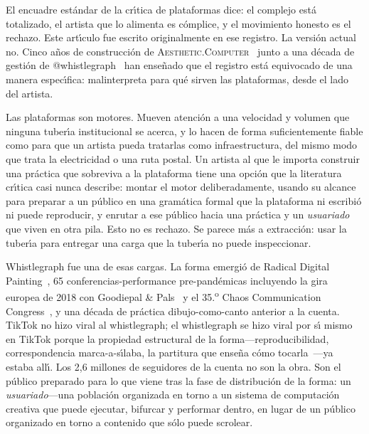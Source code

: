 \documentclass[10pt,letterpaper,twocolumn]{article}
\newcommand{\ac}{\textsc{Aesthetic.Computer}}
\begin{document}
El encuadre est\'{a}ndar de la cr\'{\i}tica de plataformas dice: el complejo est\'{a} totalizado, el artista que lo alimenta es c\'{o}mplice, y el movimiento honesto es el rechazo. Este art\'{\i}culo fue escrito originalmente en ese registro. La versi\'{o}n actual no. Cinco a\~{n}os de construcci\'{o}n de \ac{}~\citep{scudder2026ac} junto a una d\'{e}cada de gesti\'{o}n de @whistlegraph~\citep{scudder2026whistlegraph} han ense\~{n}ado que el registro est\'{a} equivocado de una manera espec\'{\i}fica: malinterpreta para qu\'{e} sirven las plataformas, desde el lado del artista.

Las plataformas son motores. Mueven atenci\'{o}n a una velocidad y volumen que ninguna tuber\'{\i}a institucional se acerca, y lo hacen de forma suficientemente fiable como para que un artista pueda tratarlas como infraestructura, del mismo modo que trata la electricidad o una ruta postal. Un artista al que le importa construir una pr\'{a}ctica que sobreviva a la plataforma tiene una opci\'{o}n que la literatura cr\'{\i}tica casi nunca describe: montar el motor deliberadamente, usando su alcance para preparar a un p\'{u}blico en una gram\'{a}tica formal que la plataforma ni escribi\'{o} ni puede reproducir, y enrutar a ese p\'{u}blico hacia una pr\'{a}ctica y un \emph{usuariado} que viven en otra pila. Esto no es rechazo. Se parece m\'{a}s a extracci\'{o}n: usar la tuber\'{\i}a para entregar una carga que la tuber\'{\i}a no puede inspeccionar.

Whistlegraph fue una de esas cargas. La forma emergi\'{o} de Radical Digital Painting~\citep{scudder2017manifesto}, 65 conferencias-performance pre-pand\'{e}micas incluyendo la gira europea de 2018 con Goodiepal \& Pals~\citep{scudder2026goodiepal} y el 35.\textsuperscript{o} Chaos Communication Congress~\citep{scudder2018rdp35c3}, y una d\'{e}cada de pr\'{a}ctica dibujo-como-canto anterior a la cuenta. TikTok no hizo viral al whistlegraph; el whistlegraph se hizo viral por s\'{\i} mismo en TikTok porque la propiedad estructural de la forma---reproducibilidad, correspondencia marca-a-s\'{\i}laba, la partitura que ense\~{n}a c\'{o}mo tocarla~\citep{scudder2026whistlegraph}---ya estaba all\'{\i}. Los 2,6 millones de seguidores de la cuenta no son la obra. Son el p\'{u}blico preparado para lo que viene tras la fase de distribuci\'{o}n de la forma: un \emph{usuariado}---una poblaci\'{o}n organizada en torno a un sistema de computaci\'{o}n creativa que puede ejecutar, bifurcar y performar dentro, en lugar de un p\'{u}blico organizado en torno a contenido que s\'{o}lo puede scrolear.
\end{document}

